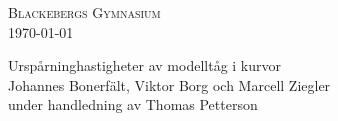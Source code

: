 \noindent\textsc{Blackebergs Gymnasium}\\
\today
\vfill

\begin{center}
\LARGE{Urspårninghastigheter av modelltåg i kurvor} \\[0.75em]
\large{Johannes Bonerfält, Viktor Borg och Marcell Ziegler} \\[0.5em]
under handledning av Thomas Petterson
\end{center}

\vfill